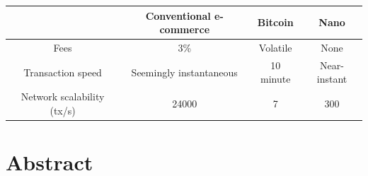 \documentclass{ferseminar}
\begin{document}
\begin{center}
	\begin{tabular}{ |c||c|c|c| }
		\hline
		& Conventional e-commerce & Bitcoin & Nano\\ 
		\hline\hline
		Fees & 3\% & Volatile & None\\  
		\hline
		Transaction speed & Seemingly instantaneous & 10 minute & Near-instant\\
		\hline
		Network scalability (tx/s) & 24000 & 7 & 300\\
		\hline
	\end{tabular}
\end{center}
\section{Abstract}
\end{document}
